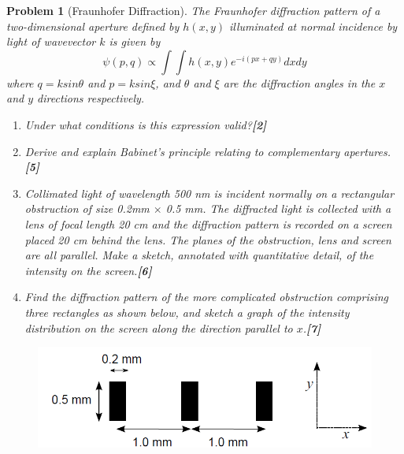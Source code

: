 \documentclass[a4paper]{article}
\theoremstyle{new}
\newtheorem{qns}{Problem}[subsection]
\begin{document}
\begin{qns}[Fraunhofer Diffraction]
The Fraunhofer diffraction pattern of a two-dimensional aperture defined by $h(x,y)$ illuminated at normal incidence by light of wavevector $k$ is given by
$$\psi(p,q)\propto\int\int h(x,y)e^{-i(px+qy)}dxdy$$
where $q = k sin\theta$ and $p = k sin\xi$, and $\theta$ and $\xi$ are the diffraction angles in the $x$ and $y$ directions respectively.
\begin{enumerate}[label=(\roman*)]
\item Under what conditions is this expression valid?\hfill\textbf{[2]}
\item Derive and explain Babinet’s principle relating to complementary apertures.\hfill\textbf{[5]}
\item Collimated light of wavelength 500 nm is incident normally on a rectangular obstruction of size 0.2mm $\times$ 0.5 mm. The diffracted light is collected with a lens of focal length 20 cm and the diffraction pattern is recorded on a screen placed 20 cm behind the lens. The planes of the obstruction, lens and screen are all parallel. Make a sketch, annotated with quantitative detail, of the intensity on the screen.\hfill\textbf{[6]}
\item Find the diffraction pattern of the more complicated obstruction comprising three rectangles as shown below, and sketch a graph of the intensity distribution on the screen along the direction parallel to $x$.\hfill\textbf{[7]}
\end{enumerate}
\begin{figure}[H]
    \centering
    \includegraphics[scale=0.45]{2016P2B8Q.PNG}
\end{figure}
\end{qns}
\newpage
\end{document}
